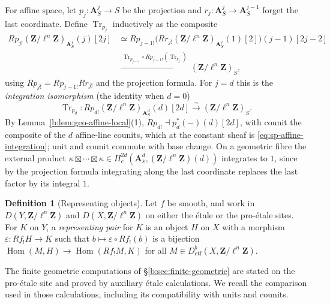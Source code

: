 \documentclass[11pt,a4paper]{article}
\numberwithin{equation}{section}
\theoremstyle{definition}
\newtheorem{definition}[theorem]{Definition}
\theoremstyle{remark}
\newcommand{\Dctf}{D^b_{\mathrm{ctf}}}
\begin{document}
For affine space, let $p_j:\mathbf A^j_S\to S$ be the projection and
$r_j:\mathbf A^j_S\to\mathbf A^{j-1}_S$ forget the last coordinate.
Define $\operatorname{Tr}_{p_j}$ inductively as the composite
\[
 \begin{aligned}
 Rp_{j!}(\mathbf Z/\ell^n\mathbf Z)_{\mathbf A^j_S}(j)[2j]
 &\simeq Rp_{j-1!}\bigl(Rr_{j!}(\mathbf Z/\ell^n\mathbf Z)_{\mathbf A^j_S}(1)[2]\bigr)(j-1)[2j-2]\\
 &\xrightarrow{\ \operatorname{Tr}_{p_{j-1}}\circ Rp_{j-1!}(\operatorname{Tr}_{r_j})\ }
 (\mathbf Z/\ell^n\mathbf Z)_S,
 \end{aligned}
\]
using $Rp_{j!}=Rp_{j-1!}Rr_{j!}$ and the projection formula. For $j=d$
this is the \emph{integration isomorphism} (the identity when $d=0$)
\begin{equation}\label{eq:sp-affine-integration}
 \operatorname{Tr}_{p_d}:Rp_{d!}(\mathbf Z/\ell^n\mathbf Z)_{\mathbf A^d_S}(d)[2d]
       \xrightarrow{\sim}(\mathbf Z/\ell^n\mathbf Z)_{S}.
\end{equation}
By Lemma~\ref{b:lem:geo-affine-local}(1), $Rp_{d!}\dashv
p_d^*(-)(d)[2d]$, with counit the composite of the $d$ affine-line
counits, which at the constant sheaf is
\eqref{eq:sp-affine-integration}; unit and counit commute with base
change. On a geometric fibre the external product
$\kappa\boxtimes\cdots\boxtimes\kappa\in
H_c^{2d}(\mathbf A^d_{\bar s},(\mathbf Z/\ell^n\mathbf Z)(d))$
integrates to $1$, since by the projection formula integrating along the
last coordinate replaces the last factor by its integral $1$.

\begin{definition}[Representing objects]\label{def:sp-representing-pair}
Let $f$ be smooth, and work in $D(Y,\mathbf Z/\ell^n\mathbf Z)$ and
$D(X,\mathbf Z/\ell^n\mathbf Z)$ on either the \'etale or the
pro-\'etale sites. For $K$ on $Y$, a \emph{representing pair} for $K$
is an object $H$ on $X$ with a morphism $\varepsilon:Rf_!H\to K$ such
that $b\mapsto\varepsilon\circ Rf_!(b)$ is a bijection
$\operatorname{Hom}(M,H)\to\operatorname{Hom}(Rf_!M,K)$ for all
$M\in\Dctf(X,\mathbf Z/\ell^n\mathbf Z)$.
\end{definition}

The finite geometric computations of
\S\ref{b:sec:finite-geometric} are stated on the pro-\'etale site
and proved by auxiliary \'etale calculations. We recall the comparison
used in those calculations, including its compatibility with units
and counits.
\end{document}
